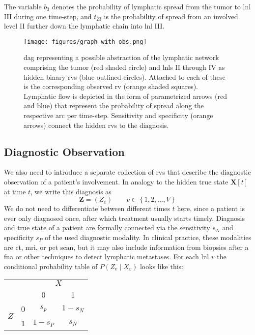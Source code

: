 \documentclass[twocolumn]{aastex631}
\begin{document}
The variable $b_3$ denotes the probability of lymphatic spread from the tumor to \gls{lnl} III during one time-step, and $t_{23}$ is the probability of spread from an involved level II further down the lymphatic chain into \gls{lnl} III. 

\begin{figure}
    \centering
    \texttt{[image: figures/graph\_with\_obs.png]}
    \caption{\Gls{dag} representing a possible abstraction of the lymphatic network comprising the tumor (red shaded circle) and \glspl{lnl} II through IV as hidden binary \glspl{rv} (blue outlined circles). Attached to each of these is the corresponding observed \gls{rv} (orange shaded squares). Lymphatic flow is depicted in the form of parametrized arrows (red and blue) that represent the probability of spread along the respective arc per time-step. Sensitivity and specificity (orange arrows) connect the hidden \glspl{rv} to the diagnosis.}
    \label{fig:graph_with_obs}
\end{figure}


\subsection{Diagnostic Observation}
\label{subsec:formalism:diagnosis}

We also need to introduce a separate collection of \glspl{rv} that describe the diagnostic observation of a patient's involvement. In analogy to the hidden true state $\mathbf{X}[t]$ at time $t$, we write this diagnosis as
%
\begin{equation}
    \mathbf{Z} = \left( Z_v \right) \qquad v \in \left\{ 1,2, \ldots, V \right\}
\end{equation}
%
We do not need to differentiate between different times $t$ here, since a patient is ever only diagnosed once, after which treatment usually starts timely.
Diagnosis and true state of a patient are formally connected via the sensitivity $s_N$ and specificity $s_P$ of the used diagnostic modality. In clinical practice, these modalities are \gls{ct}, \gls{mri}, or \gls{pet} scan, but it may also include information from biopsies after a \gls{fna} or other techniques to detect lymphatic metastases. For each \gls{lnl} $v$ the conditional probability table of $P\left( Z_v \mid X_v \right)$ looks like this:

\noindent
\begin{center}
    \begin{tabular}{|cc|cc|}
        \hline
        & & \multicolumn{2}{c|}{$X$} \\
        & & 0 & 1 \\
        \hline
        \multirow{2}{*}{$Z$} & 0 & $s_p$ & $1 - s_N$ \\
        & 1 & $1 - s_P$ & $s_N$ \\
        \hline
    \end{tabular}
\end{center}
\end{document}

